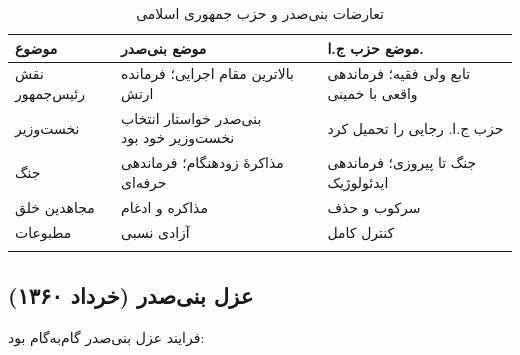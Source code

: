 \documentclass[12pt,a4paper]{book}
\begin{document}
\begin{longtable}{%
    >{\raggedleft\arraybackslash}p{}
    >{\raggedleft\arraybackslash}p{}
    >{\raggedleft\arraybackslash}p{}}
\toprule
\rowcolor{cPrimary!10}
\textbf{موضوع} & \textbf{موضع بنی‌صدر} & \textbf{موضع حزب ج.ا.} \\
\midrule
\endhead

نقش رئیس‌جمهور &
بالاترین مقام اجرایی؛ فرمانده ارتش &
تابع ولی فقیه؛ فرماندهی واقعی با خمینی \\
\midrule

نخست‌وزیر &
بنی‌صدر خواستار انتخاب نخست‌وزیر خود بود &
حزب ج.ا. رجایی را تحمیل کرد \\
\midrule

جنگ &
مذاکرهٔ زودهنگام؛ فرماندهی حرفه‌ای &
جنگ تا پیروزی؛ فرماندهی ایدئولوژیک \\
\midrule

مجاهدین خلق &
مذاکره و ادغام &
سرکوب و حذف \\
\midrule

مطبوعات &
آزادی نسبی &
کنترل کامل \\

\bottomrule
\caption{تعارضات بنی‌صدر و حزب جمهوری اسلامی}
\label{tab:banisadr-vs-irp}
\end{longtable}

\subsection{عزل بنی‌صدر (خرداد ۱۳۶۰)}

فرایند عزل بنی‌صدر گام‌به‌گام بود:
\end{document}
